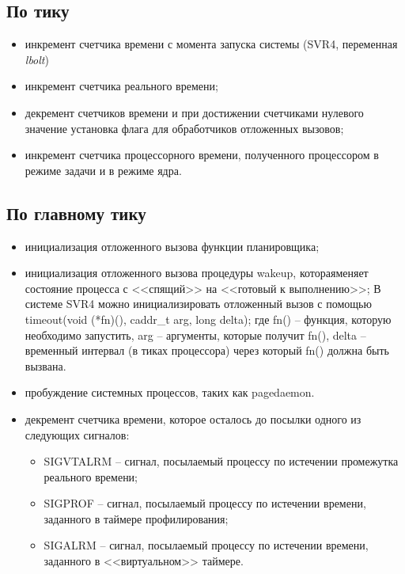 \subsection*{По тику}

\begin{itemize}
	\item инкремент счетчика времени с момента запуска системы (SVR4, переменная \textit{lbolt})
	\item инкремент счетчика реального времени; %
	\item декремент счетчиков времени и при достижении счетчиками нулевого значение установка флага для обработчиков отложенных вызовов;
	\item инкремент счетчика процессорного времени, полученного процессором в режиме задачи и в режиме ядра.
\end{itemize}

\subsection*{По главному тику}

\begin{itemize}
	\item инициализация отложенного вызова функции планировщика;
	\item инициализация отложенного вызова процедуры wakeup, котораяменяет состояние процесса с <<спящий>> на <<готовый к выполнению>>;
	В системе SVR4 можно инициализировать отложенный вызов с помощью timeout(void (*fn)(), caddr\_t arg, long delta); где fn() -- функция, которую необходимо запустить, arg -- аргументы, которые получит fn(), delta -- временный интервал (в тиках процессора) через который fn() должна быть вызвана.

	\item пробуждение системных процессов, таких как pagedaemon.

	\item декремент счетчика времени, которое осталось до посылки одного из следующих сигналов:
	\begin{itemize}
		\item SIGVTALRM – сигнал, посылаемый процессу по истечении промежутка реального времени;
		\item SIGPROF – сигнал, посылаемый процессу по истечении времени, заданного в таймере профилирования;
		\item SIGALRM – сигнал, посылаемый процессу по истечении времени, заданного в <<виртуальном>> таймере.
	\end{itemize}
\end{itemize}

